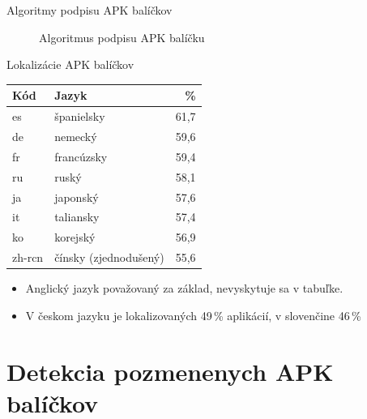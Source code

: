 \documentclass{beamer}
\begin{document}
  
   \begin{frame}[label=lists]{Algoritmy podpisu APK balíčkov}
\begin{figure}[H]
\centering
\begin{bchart}[min=0,max=80,step=10,unit=\%]
\bcskip{6pt}
\bcskip{6pt}
\bcskip{6pt}
\bcskip{6pt}
\bcskip{6pt}
\bcskip{3pt}
\end{bchart}

\caption{Algoritmus podpisu APK balíčku}
\label{fig:signAlg}
\end{figure}
  \end{frame} 

   \begin{frame}[label=lists]{Lokalizácie APK balíčkov}
\begin{table}[htb]
\centering
  \begin{tabular}{|l l r|}
    \hline
    \textbf{Kód} & \textbf{Jazyk} &  \textbf{\%} \\\hline\hline
    es & španielsky & 61,7 \\
    de & nemecký & 59,6 \\
    fr & francúzsky & 59,4 \\
    ru & ruský & 58,1 \\
    ja & japonský & 57,6 \\
    it & taliansky & 57,4 \\
	ko & korejský & 56,9 \\
	zh-rcn & čínsky (zjednodušený) & 55,6\\
    \hline
  \end{tabular}
  \label{tab:language}
\end{table}
\begin{itemize}
\item Anglický jazyk považovaný za základ, nevyskytuje sa v tabuľke.
\item V českom jazyku je lokalizovaných 49\,\% aplikácií, v slovenčine 46\,\%
\end{itemize}
\end{frame}

\section{Detekcia pozmenenych APK balíčkov}
\end{document}
